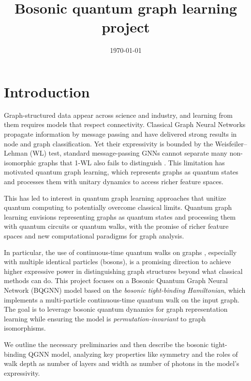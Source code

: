\documentclass[11pt]{article}
\title{Bosonic quantum graph learning project}
\author{}
\date{\today}
\begin{document}
\maketitle

\section{Introduction}

Graph-structured data appear across science and industry, and learning from them requires models that respect connectivity. Classical Graph Neural Networks propagate information by message passing and have delivered strong results in node and graph classification. Yet their expressivity is bounded by the Weisfeiler--Lehman (WL) test, standard message-passing GNNs cannot separate many non-isomorphic graphs that 1-WL also fails to distinguish \citep{xu2019howpowerful,morris2019wl}. This limitation has motivated quantum graph learning, which represents graphs as quantum states and processes them with unitary dynamics to access richer feature spaces.

This has led to interest in quantum graph learning approaches that unitize quantum computing to potentially overcome classical limits. Quantum graph learning \citep{verdon2019qgnn,bai2018qsgcnn,dernbach2018qw_nn,zheng2021qgcn,schuld2019feature,havlivcek2019qkernels} envisions representing graphs as quantum states and processing them with quantum circuits or quantum walks, with the promise of richer feature spaces and new computational paradigms for graph analysis.

In particular, the use of continuous-time quantum walks on graphs \citep{godsil2013avgmixing,coutinho2017avgmixing,hong1987hom,aaronson2011bosonsampling}, especially with multiple identical particles (bosons), is a promising direction to achieve higher expressive power in distinguishing graph structures beyond what classical methods can do. This project focuses on a Bosonic Quantum Graph Neural Network (BQGNN) model based on the \emph{bosonic tight-binding Hamiltonian}, which implements a multi-particle continuous-time quantum walk on the input graph. The goal is to leverage bosonic quantum dynamics for graph representation learning while ensuring the model is \emph{permutation-invariant} to graph isomorphisms.

We outline the necessary preliminaries and then describe the bosonic tight-binding QGNN model, analyzing key properties like symmetry and the roles of walk depth as number of layers and width as number of photons in the model's expressivity.
\end{document}
